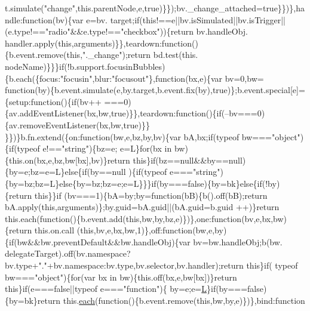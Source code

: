 \begin{DoxyCode}
      t.simulate(\textcolor{stringliteral}{"change"},this.parentNode,e,true)\}\});bv.\_change\_attached=true\}\})\},handle:\textcolor{keyword}{function}(bv)\{var e=bv.
      target;\textcolor{keywordflow}{if}(\textcolor{keyword}{this}!==e||bv.isSimulated||bv.isTrigger||(e.type!==\textcolor{stringliteral}{"radio"}&&e.type!==\textcolor{stringliteral}{"checkbox"}))\{\textcolor{keywordflow}{return} bv.handleObj.
      handler.apply(\textcolor{keyword}{this},arguments)\}\},teardown:\textcolor{keyword}{function}()\{b.event.remove(\textcolor{keyword}{this},\textcolor{stringliteral}{".\_change"});\textcolor{keywordflow}{return} bd.test(this.
      nodeName)\}\}\}\textcolor{keywordflow}{if}(!b.support.focusinBubbles)\{b.each(\{focus:\textcolor{stringliteral}{"focusin"},blur:\textcolor{stringliteral}{"focusout"}\},\textcolor{keyword}{function}(bx,e)\{var bv=0,bw=\textcolor{keyword}{
      function}(by)\{b.event.simulate(e,by.target,b.event.fix(by),\textcolor{keyword}{true})\};b.event.special[e]=\{setup:\textcolor{keyword}{function}()\{\textcolor{keywordflow}{if}(bv++
      ===0)\{av.addEventListener(bx,bw,\textcolor{keyword}{true})\}\},teardown:\textcolor{keyword}{function}()\{\textcolor{keywordflow}{if}(--bv===0)\{av.removeEventListener(bx,bw,\textcolor{keyword}{true})\}\}
      \}\})\}b.fn.extend(\{on:function(bw,e,bz,by,bv)\{var bA,bx;if(typeof bw===\textcolor{stringliteral}{"object"})\{if(typeof e!==\textcolor{stringliteral}{"string"})\{bz=e;
      e=L\}for(bx in bw)\{this.on(bx,e,bz,bw[bx],bv)\}return this\}if(bz==null&&by==null)\{by=e;bz=e=L\}else\{if(by==null
      )\{if(typeof e===\textcolor{stringliteral}{"string"})\{by=bz;bz=L\}else\{by=bz;bz=e;e=L\}\}\}if(by===false)\{by=bk\}else\{if(!by)\{return this\}\}if
      (bv===1)\{bA=by;by=function(bB)\{b().off(bB);return bA.apply(this,arguments)\};by.guid=bA.guid||(bA.guid=b.guid
      ++)\}return this.each(function()\{b.event.add(this,bw,by,bz,e)\})\},one:\textcolor{keyword}{function}(bv,e,bx,bw)\{return this.on.call
      (this,bv,e,bx,bw,1)\},off:\textcolor{keyword}{function}(bw,e,by)\{if(bw&&bw.preventDefault&&bw.handleObj)\{var bv=bw.handleObj;b(bw.
      delegateTarget).off(bv.namespace?bv.type+\textcolor{stringliteral}{"."}+bv.namespace:bv.type,bv.selector,bv.handler);return this\}\textcolor{keywordflow}{if}(
      typeof bw===\textcolor{stringliteral}{"object"})\{for(var bx in bw)\{this.off(bx,e,bw[bx])\}\textcolor{keywordflow}{return} \textcolor{keyword}{this}\}\textcolor{keywordflow}{if}(e===\textcolor{keyword}{false}||typeof e===\textcolor{stringliteral}{"function"})\{
      by=e;e=\hyperlink{jquery_8js_a38ee4c0b5f4fe2a18d0c783af540d253}{L}\}\textcolor{keywordflow}{if}(by===\textcolor{keyword}{false})\{by=bk\}\textcolor{keywordflow}{return} this.\hyperlink{jquery_8js_a871ff39db627c54c710a3e9909b8234c}{each}(\textcolor{keyword}{function}()\{b.event.remove(\textcolor{keyword}{this},bw,by,e)\})\},bind:\textcolor{keyword}{function}

\end{DoxyCode}
